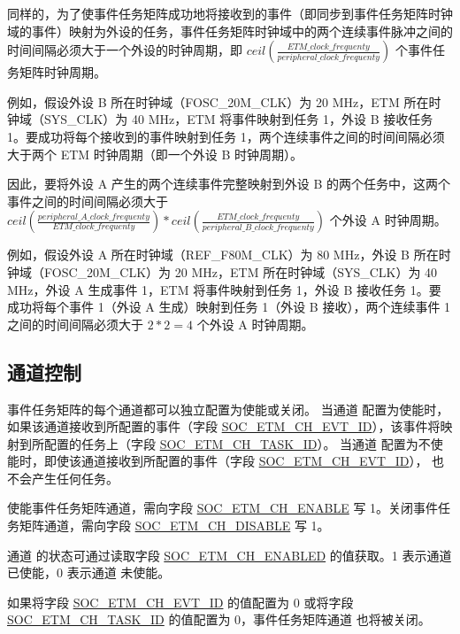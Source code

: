 \documentclass[main\_\_CN.tex]{subfiles}
\begin{document}
同样的，为了使事件任务矩阵成功地将接收到的事件（即同步到事件任务矩阵时钟域的事件）映射为外设的任务，事件任务矩阵时钟域中的两个连续事件脉冲之间的时间间隔必须大于一个外设的时钟周期，即 $ceil(\frac{ETM\_clock\_frequenty}{peripheral\_clock\_frequenty})$ 个事件任务矩阵时钟周期。

例如，假设外设 B 所在时钟域（FOSC\_20M\_CLK）为 20 MHz，ETM 所在时钟域（SYS\_CLK）为 40 MHz，ETM 将事件映射到任务 1，外设 B 接收任务 1。要成功将每个接收到的事件映射到任务 1，两个连续事件之间的时间间隔必须大于两个 ETM 时钟周期（即一个外设 B 时钟周期）。

因此，要将外设 A 产生的两个连续事件完整映射到外设 B 的两个任务中，这两个事件之间的时间间隔必须大于$ceil(\frac{peripheral\_A\_clock\_frequenty}{ETM\_clock\_frequenty })*ceil(\frac{ETM\_clock\_frequenty}{peripheral\_B\_clock\_frequenty})$ 个外设 A 时钟周期。

例如，假设外设 A 所在时钟域（REF\_F80M\_CLK）为 80 MHz，外设 B 所在时钟域（FOSC\_20M\_CLK）为 20 MHz，ETM 所在时钟域（SYS\_CLK）为 40 MHz，外设 A 生成事件 1，ETM 将事件映射到任务 1，外设 B 接收任务 1。要成功将每个事件 1（外设 A 生成）映射到任务 1（外设 B 接收），两个连续事件 1 之间的时间间隔必须大于 $2*2=4$ 个外设 A 时钟周期。

\subsection{通道控制}
\label{sec:evntaskmatrix-channel-enable}

事件任务矩阵的每个通道都可以独立配置为使能或关闭。 当通道 配置为使能时，如果该通道接收到所配置的事件（字段 \hyperref[fielddesc:SOCETMCH0EVTID]{SOC\_ETM\_CH\_EVT\_ID}），该事件将映射到所配置的任务上（字段 \hyperref[fielddesc:SOCETMCH0TASKID]{SOC\_ETM\_CH\_TASK\_ID}）。 当通道 配置为不使能时，即使该通道接收到所配置的事件（字段 \hyperref[fielddesc:SOCETMCH0EVTID]{SOC\_ETM\_CH\_EVT\_ID}）， 也不会产生任何任务。

使能事件任务矩阵通道，需向字段 \hyperref[fielddesc:SOCETMCHENABLE0]{SOC\_ETM\_CH\_ENABLE} 写 1。关闭事件任务矩阵通道，需向字段 \hyperref[fielddesc:SOCETMCHDISABLE0]{SOC\_ETM\_CH\_DISABLE} 写 1。

通道 的状态可通过读取字段 \hyperref[fielddesc:SOCETMCHENABLED0]{SOC\_ETM\_CH\_ENABLED} 的值获取。1 表示通道 已使能，0 表示通道 未使能。

如果将字段 \hyperref[fielddesc:SOCETMCH0EVTID]{SOC\_ETM\_CH\_EVT\_ID} 的值配置为 0 或将字段 \hyperref[fielddesc:SOCETMCH0TASKID]{SOC\_ETM\_CH\_TASK\_ID} 的值配置为 0，事件任务矩阵通道 也将被关闭。
\end{document}
